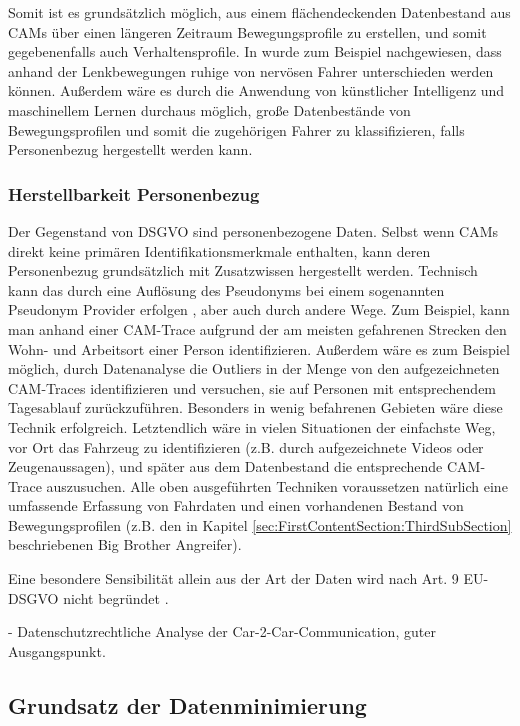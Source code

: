 Somit ist es grundsätzlich möglich, aus einem flächendeckenden Datenbestand aus CAMs über einen längeren Zeitraum Bewegungsprofile zu erstellen, und somit gegebenenfalls auch Verhaltensprofile. In \cite{Dettki2005} wurde zum Beispiel nachgewiesen, dass anhand der Lenkbewegungen ruhige von nervösen Fahrer unterschieden werden können. Außerdem wäre es durch die Anwendung von künstlicher Intelligenz und maschinellem Lernen durchaus möglich, große Datenbestände von Bewegungsprofilen und somit die zugehörigen Fahrer zu klassifizieren, falls Personenbezug hergestellt werden kann. 

\subsubsection{Herstellbarkeit Personenbezug}
\label{sec:SecondContentSection:SecondSubsection:SecondSubSubsection}

Der Gegenstand von DSGVO sind personenbezogene Daten. Selbst wenn CAMs direkt keine primären Identifikationsmerkmale enthalten, kann deren Personenbezug grundsätzlich mit Zusatzwissen hergestellt werden. Technisch kann das durch eine Auflösung des Pseudonyms bei einem sogenannten Pseudonym Provider erfolgen \cite{Kiometzis2017}, aber auch durch andere Wege. Zum Beispiel, kann man anhand einer CAM-Trace aufgrund der am meisten gefahrenen Strecken den Wohn- und Arbeitsort einer Person identifizieren. Außerdem wäre es zum Beispiel möglich, durch Datenanalyse die Outliers in der Menge von den aufgezeichneten CAM-Traces identifizieren und versuchen, sie auf Personen mit entsprechendem Tagesablauf zurückzuführen. Besonders in wenig befahrenen Gebieten wäre diese Technik erfolgreich. Letztendlich wäre in vielen Situationen der einfachste Weg, vor Ort das Fahrzeug zu identifizieren (z.B. durch aufgezeichnete Videos oder Zeugenaussagen), und später aus dem Datenbestand die entsprechende CAM-Trace auszusuchen. Alle oben ausgeführten Techniken voraussetzen natürlich eine umfassende Erfassung von Fahrdaten und einen vorhandenen Bestand von Bewegungsprofilen (z.B. den in Kapitel \ref{sec:FirstContentSection:ThirdSubSection} beschriebenen Big Brother Angreifer).

Eine besondere Sensibilität allein aus der Art der Daten wird nach Art. 9 EU-DSGVO nicht begründet \cite{Weichert2016}.

\cite{Weichert2016} - Datenschutzrechtliche Analyse der Car-2-Car-Communication, guter Ausgangspunkt.

\subsection{Grundsatz der Datenminimierung}

